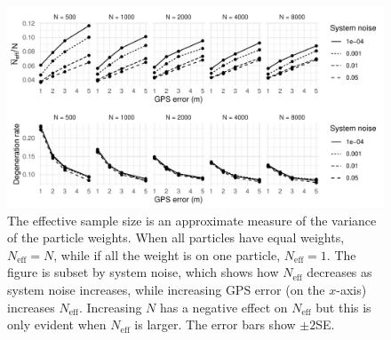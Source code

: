 \begin{figure}[tb]
    \centering
    \includegraphics[width=\textwidth]{figures/04_model_results_neff.pdf}
    \caption{
        The effective sample size is an approximate measure of the variance
        of the particle weights.
        When all particles have equal weights, $N_\text{eff} = N$,
        while if all the weight is on one particle, $N_\text{eff} = 1$. 
        The figure is subset by system noise, which shows how $N_\text{eff}$ 
        decreases as system noise increases,
        while increasing GPS error (on the $x$-axis) increases $N_\text{eff}$.
        Increasing $N$ has a negative effect on $N_\text{eff}$ but this is
        only evident when $N_\text{eff}$ is larger.
        The error bars show $\pm 2$SE.
    }
    \label{fig:perf_stats}
\end{figure}



